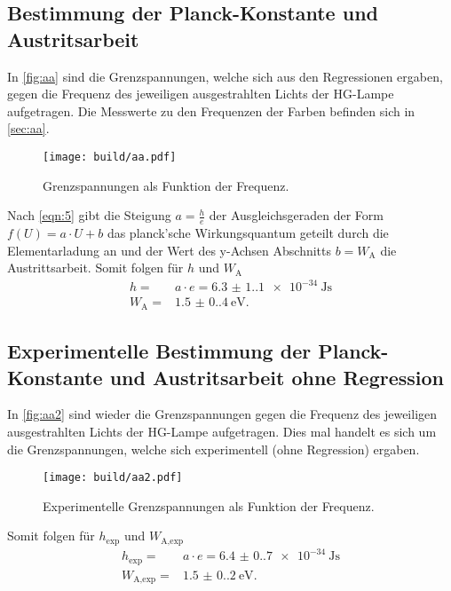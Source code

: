 \subsection{Bestimmung der Planck-Konstante und Austritsarbeit}
\label{sec:planckWa}
\noindent In \autoref{fig:aa} sind die Grenzspannungen, welche sich aus den 
Regressionen ergaben, gegen die Frequenz des jeweiligen ausgestrahlten Lichts
der HG-Lampe aufgetragen. Die Messwerte zu den Frequenzen der Farben befinden
sich in \autoref{sec:aa}. 
\begin{figure}[H]
    \centering
    \caption{Grenzspannungen als Funktion der Frequenz.}
    \label{fig:aa}
    \texttt{[image: build/aa.pdf]}
\end{figure} 
\noindent Nach \autoref{eqn:5} gibt die Steigung $a = \frac{h}{e}$ der Ausgleichsgeraden der Form $f(U) = a\cdot U + b$ das planck'sche Wirkungsquantum geteilt durch die 
Elementarladung an und der Wert des y-Achsen Abschnitts $b =  W_\text{A}$
die Austrittsarbeit. Somit folgen für $h$ und $W_\text{A}$
\begin{align}
    h =& a\cdot e = \qty{6.3(1.1)e-34}{\joule\second}\\
    W_\text{A} =& \qty{1.5(0.4)}{\eV}.
\end{align}

\subsection{Experimentelle Bestimmung der Planck-Konstante und Austritsarbeit ohne Regression}
\label{sec:planckWa}
\noindent In \autoref{fig:aa2} sind wieder die Grenzspannungen gegen die 
Frequenz des jeweiligen ausgestrahlten Lichts der HG-Lampe aufgetragen. 
Dies mal handelt es sich um die Grenzspannungen, welche sich experimentell 
(ohne Regression) ergaben.
\begin{figure}[H]
    \centering
    \caption{Experimentelle Grenzspannungen als Funktion der Frequenz.}
    \label{fig:aa2}
    \texttt{[image: build/aa2.pdf]}
\end{figure} 
\noindent Somit folgen für $h_\text{exp} $ und $W_\text{A,exp}$
\begin{align}
    h_\text{exp} =& a\cdot e = \qty{6.4(0.7)e-34}{\joule\second}\\
    W_\text{A,exp} =& \qty{1.5(0.2)}{\eV}.
\end{align}